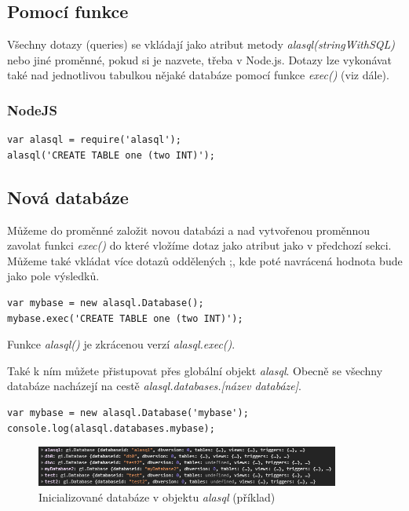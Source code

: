 \documentclass[a4, titlepage]{article}
\begin{document}
\subsection{Pomocí funkce}
Všechny dotazy (queries) se vkládají jako atribut metody \textit{alasql(stringWithSQL)} nebo jiné proměnné, pokud si je nazvete, třeba v Node.js. Dotazy lze vykonávat také nad jednotlivou tabulkou nějaké databáze pomocí funkce \textit{exec()} (viz dále).

\subsubsection{NodeJS}
\begin{lstlisting}
var alasql = require('alasql');
alasql('CREATE TABLE one (two INT)');
\end{lstlisting}

\subsection{Nová databáze}
Můžeme do proměnné založit novou databázi a nad vytvořenou proměnnou zavolat funkci \textit{exec()} do které vložíme dotaz jako atribut jako v předchozí sekci. Můžeme také vkládat více dotazů oddělených ;, kde poté navrácená hodnota bude jako pole výsledků.

\begin{lstlisting}
var mybase = new alasql.Database();
mybase.exec('CREATE TABLE one (two INT)');
\end{lstlisting}

Funkce \textit{alasql()} je zkrácenou verzí \textit{alasql.exec()}.

Také k ním můžete přistupovat přes globální objekt \textit{alasql}. Obecně se všechny databáze nacházejí na cestě \textit{alasql.databases.[název databáze]}.

\begin{lstlisting}
var mybase = new alasql.Database('mybase');
console.log(alasql.databases.mybase);
\end{lstlisting}

\begin{figure}[h]
    \centering
    \includegraphics[width=10cm]{databases}
    \caption{Inicializované databáze v objektu \textit{alasql} (příklad)}
\end{figure}
\end{document}
